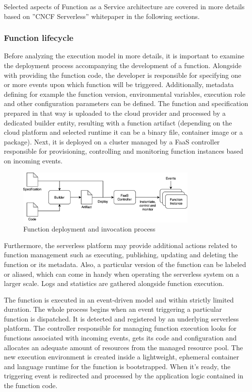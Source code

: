Selected aspects of Function as a Service architecture are covered in more details based on ''CNCF Serverless'' whitepaper \cite{CNCFServerless} in the following sections.

\subsubsection*{Function lifecycle}

Before analyzing the execution model in more details, it is important to examine the deployment process accompanying the development of a function. Alongside with providing the function code, the developer is responsible for specifying one or more events upon which function will be triggered. Additionally, metadata defining for example the function version, environmental variables, execution role and other configuration parameters can be defined. The function and specification prepared in that way is uploaded to the cloud provider and processed by a dedicated builder entity, resulting with a function artifact (depending on the cloud platform and selected runtime it can be a binary file, container image or a package). Next, it is deployed on a cluster managed by a FaaS controller responsible for provisioning, controlling and monitoring function instances based on incoming events.

\begin{figure}[h]
    \centering
    \includegraphics[width=0.8\textwidth]{assets/02-serverless/ServerlessDeployment.png}
    \caption{Function deployment and invocation process}
    \label{fig:cloudguru-architecture-diagram}
\end{figure}

Furthermore, the serverless platform may provide additional actions related to function management such as executing, publishing, updating and deleting the function or its metadata. Also, a particular version of the function can be labeled or aliased, which can come in handy when operating the serverless system on a larger scale. Logs and statistics are gathered alongside function execution.

The function is executed in an event-driven model and within strictly limited duration. The whole process begins when an event triggering a particular function is dispatched. It is detected and registered by an underlying serverless platform. The controller responsible for managing function execution looks for functions associated with incoming events, gets its code and configuration and allocates an adequate amount of resources from the managed resource pool. The new execution environment is created inside a lightweight, ephemeral container and language runtime for the function is bootstrapped. When it's ready, the triggering event is redirected and processed by the application logic contained in the function code.


